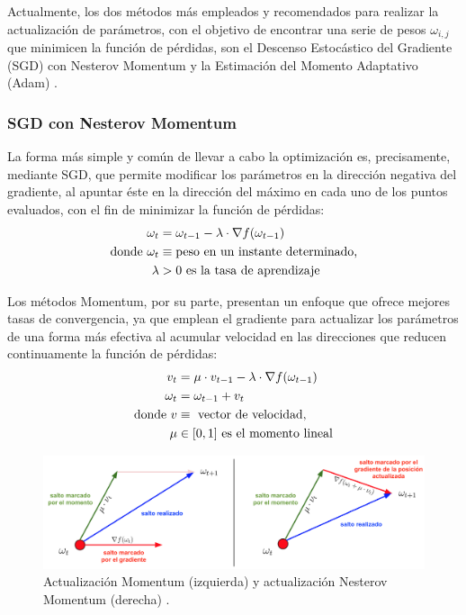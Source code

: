 Actualmente, los dos métodos más empleados y recomendados para realizar la actualización de parámetros, con el objetivo de encontrar una serie de pesos $\omega_{i,j}$ que minimicen la función de pérdidas, son el Descenso Estocástico del Gradiente (SGD) con Nesterov Momentum y la Estimación del Momento Adaptativo (Adam) \cite{CS231n}.

\subsubsection{SGD con Nesterov Momentum}

La forma más simple y común de llevar a cabo la optimización es, precisamente, mediante SGD, que permite modificar los parámetros en la dirección negativa del gradiente, al apuntar éste en la dirección del máximo en cada uno de los puntos evaluados, con el fin de minimizar la función de pérdidas:
\begin{align*}
    \omega_t &= \omega_{t-1} - \lambda \cdot \nabla f(\omega_{t-1}) \\
    \text{donde}~
    \omega_t &\equiv \text{peso en un instante determinado,} \\
    \lambda &> 0 \text{\space es la tasa de aprendizaje}
\end{align*}

Los métodos Momentum, por su parte, presentan un enfoque que ofrece mejores tasas de convergencia, ya que emplean el gradiente para actualizar los parámetros de una forma más efectiva al acumular velocidad en las direcciones que reducen continuamente la función de pérdidas:
\begin{align*}
    v_t &= \mu \cdot v_{t-1} - \lambda \cdot \nabla f(\omega_{t-1}) \\
    \omega_t &= \omega_{t-1} + v_t \\
    \text{donde}~
    v &\equiv \text{ vector de velocidad,} \\
    \mu &\in [0,1] \text{\space es el momento lineal}
\end{align*}

\begin{figure}
    \centering
    \includegraphics[width=\textwidth]{Images/NesterovMomentum.png}
    \caption{Actualización Momentum (izquierda) y actualización Nesterov Momentum (derecha) \cite{CS231n}.}
    \label{fig:NesterovMomentum}
\end{figure}

